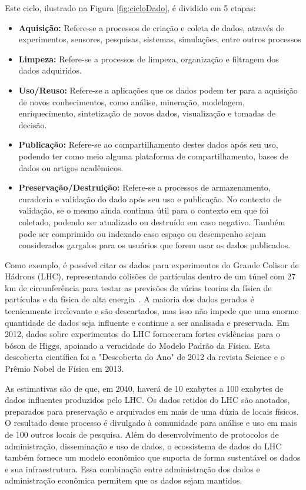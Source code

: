 \documentclass[portugues]{ic-tese}
\begin{document}
Este ciclo, ilustrado na Figura \ref{fig:cicloDado}, é dividido em 5 etapas:

\begin{itemize}
\item \textbf{Aquisição:} Refere-se a processos de criação e coleta de dados, através de experimentos, sensores, pesquisas, sistemas, simulações, entre outros processos
\item \textbf{Limpeza:} Refere-se a processos de limpeza, organização e filtragem dos dados adquiridos.
\item \textbf{Uso/Reuso:} Refere-se a aplicações que os dados podem ter para a aquisição de novos conhecimentos, como análise, mineração, modelagem, enriquecimento, sintetização de novos dados, visualização e tomadas de decisão.
\item \textbf{Publicação:} Refere-se ao compartilhamento destes dados após seu uso, podendo ter como meio alguma plataforma de compartilhamento, bases de dados ou artigos acadêmicos.
\item \textbf{Preservação/Destruição:} Refere-se a processos de armazenamento, curadoria e validação do dado após seu uso e publicação. No contexto de validação, se o mesmo ainda continua útil para o contexto em que foi coletado, podendo ser atualizado ou destruído em caso negativo. Também pode ser comprimido ou indexado caso espaço ou desempenho sejam considerados gargalos para os usuários que forem usar os dados publicados.
\end{itemize}

Como exemplo, é possível citar os dados para experimentos do Grande Colisor de Hádrons (LHC), representando colisões de partículas dentro de um túnel com 27 km de circunferência para testar as previsões de várias teorias da física de partículas e da física de alta energia~\citep{Berman_2018}. A maioria dos dados gerados é tecnicamente irrelevante e são descartados, mas isso não impede que uma enorme quantidade de dados seja influente e continue a ser analisada e preservada. Em 2012, dados sobre experimentos do LHC forneceram fortes evidências para o bóson de Higgs, apoiando a veracidade do Modelo Padrão da Física. Esta descoberta científica foi a "Descoberta do Ano" de 2012 da revista Science e o Prêmio Nobel de Física em 2013.

As estimativas são de que, em 2040, haverá de 10 exabytes a 100 exabytes de dados influentes produzidos pelo LHC. Os dados retidos do LHC são anotados, preparados para preservação e arquivados em mais de uma dúzia de locais físicos. O resultado desse processo é divulgado à comunidade para análise e uso em mais de 100 outros locais de pesquisa. Além do desenvolvimento de protocolos de administração, disseminação e uso de dados, o ecossistema de dados do LHC também fornece um modelo econômico que suporta de forma sustentável os dados e sua infraestrutura. Essa combinação entre administração dos dados e administração econômica permitem que os dados sejam mantidos.
\end{document}
